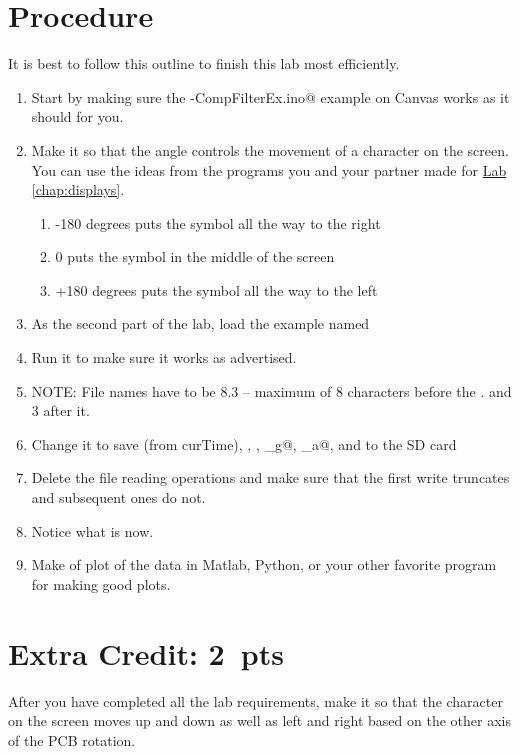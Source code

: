 \section{Procedure}
It is best to follow this outline to finish this lab most efficiently.
\begin{enumerate}
    \item Start by making sure the \lstinline@IMU-CompFilterEx.ino@ example on Canvas works as it should for you.
    \item Make it so that the angle controls the movement of a character on the screen. You can use the ideas 
            from the programs you and your partner made for \hyperref[chap:displays]{Lab \ref*{chap:displays}}.
    \begin{enumerate}
        \item -180 degrees puts the symbol all the way to the right
        \item 0 puts the symbol in the middle of the screen
        \item +180 degrees puts the symbol all the way to the left
    \end{enumerate}
    \item As the second part of the lab, load the example named \lstinline@SDReadWrite@ 
    \item Run it to make sure it works as advertised.
    \item NOTE: File names have to be 8.3 -- maximum of 8 characters before the . and 3 after it.
    \item Change it to save \lstinline@t@ (from curTime), \lstinline@ax@, \lstinline@az@, 
            \lstinline@theta_g@, \lstinline@theta_a@, and \lstinline@theta@ to the SD card 
    \item Delete the file reading operations and make sure that the first write truncates and 
            subsequent ones do not.
    \item Notice what \lstinline@dt@ is now.
    \item Make of plot of the data in Matlab, Python, or your other favorite program for making good plots.
\end{enumerate}

\section{Extra Credit: 2~pts}
After you have completed all the lab requirements, make it so that the character on the screen moves
up and down as well as left and right based on the other axis of the PCB rotation.

